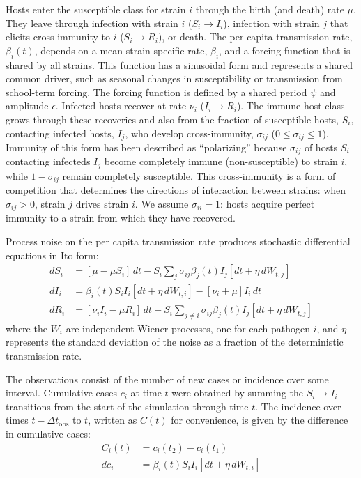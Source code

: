 Hosts enter the susceptible class for strain $i$ through the birth (and death) rate $\mu$. 
They leave through infection with strain $i$ ($S_i \to I_i$), infection with strain $j$ that elicits cross-immunity to $i$ ($S_i \to R_i$), or death.
The per capita transmission rate, $\beta_i(t)$, depends on a mean strain-specific rate, $\beta_i$, and a forcing function that is shared by all strains.
This function has a sinusoidal form and represents a shared common driver, such as seasonal changes in susceptibility or transmission from school-term forcing.
The forcing function is defined by a shared period $\psi$ and amplitude $\epsilon$.
Infected hosts recover at rate $\nu_i$ ($I_i \to R_i$).
The immune host class grows through these recoveries and also from the fraction of susceptible hosts, $S_i$, contacting infected hosts, $I_j$, who develop cross-immunity, $\sigma_{ij}$ ($0 \leq \sigma_{ij} \leq 1$).
Immunity of this form has been described as ``polarizing'' because $\sigma_{ij}$ of hosts $S_i$ contacting infecteds $I_j$ become completely immune (non-susceptible) to strain $i$, while $1-\sigma_{ij}$ remain completely susceptible.
This cross-immunity is a form of competition that determines the directions of interaction between strains: when $\sigma_{ij}>0$, strain $j$ drives strain $i$.
We assume $\sigma_{ii}=1$: hosts acquire perfect immunity to a strain from which they have recovered.

Process noise on the per capita transmission rate produces stochastic differential equations in Ito form:
\begin{align}
dS_i &=
	[\mu - \mu S_i] \, dt
	- S_i\sum\limits_{j} \sigma_{ij} \beta_j(t) I_j [dt +\eta \, dW_{t,j}] 
	\\
dI_i &= 
	\beta_i(t) S_i I_i [dt +  \eta \, dW_{t,i}]
	- [\nu_i + \mu] I_i \,  dt \\
dR_i &=
	[\nu_i I_i - \mu R_i] \, dt
	+ S_i\sum\limits_{j \neq i} \sigma_{ij} \beta_j(t) I_j [dt +  \eta \, dW_{t,j}]
\end{align}
where the $W_i$ are independent Wiener processes, one for each pathogen $i$, and $\eta$ represents the standard deviation of the noise as a fraction of the deterministic transmission rate.

The observations consist of the number of new cases or incidence over some interval. 
Cumulative cases $c_i$ at time $t$ were obtained by summing the $S_i \to I_i$ transitions from the start of the simulation through time $t$.
The incidence over times $t-\Delta t_\text{obs}$ to $t$, written as $C(t)$ for convenience, is given by the difference in cumulative cases:
\begin{align}
C_i(t) &= c_i(t_2) - c_i(t_1) \\
dc_i &= \beta_i(t) S_i I_i [dt + \eta \, dW_{t,i}]
\end{align}

